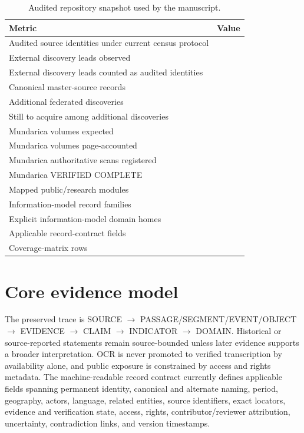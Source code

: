 \documentclass[11pt]{article}
\begin{document}
\begin{table}[ht]
\caption{Audited repository snapshot used by the manuscript.}
\label{tab:release}
\centering
\begin{tabular}{lr}
\toprule
Metric & Value \\
\midrule
Audited source identities under current census protocol & \MLHKPSourcesDiscovered{} \\
External discovery leads observed & \MLHKPWebDiscoveryLeads{} \\
External discovery leads counted as audited identities & \MLHKPWebDiscoveryCounted{} \\
Canonical master-source records & \MLHKPCanonicalSources{} \\
Additional federated discoveries & \MLHKPAdditionalDiscoveries{} \\
Still to acquire among additional discoveries & \MLHKPStillToAcquire{} \\
Mundarica volumes expected & \MLHKPMundaricaExpected{} \\
Mundarica volumes page-accounted & \MLHKPMundaricaPageAccounted{} \\
Mundarica authoritative scans registered & \MLHKPMundaricaScans{} \\
Mundarica VERIFIED COMPLETE & \MLHKPMundaricaVerified{} \\
Mapped public/research modules & \MLHKPModules{} \\
Information-model record families & \MLHKPRecordFamilies{} \\
Explicit information-model domain homes & \MLHKPDomainHomes{} \\
Applicable record-contract fields & \MLHKPRecordFields{} \\
Coverage-matrix rows & \MLHKPCoverageRows{} \\
\bottomrule
\end{tabular}
\end{table}

\section{Core evidence model}
The preserved trace is SOURCE $\rightarrow$ PASSAGE/SEGMENT/EVENT/OBJECT $\rightarrow$ EVIDENCE $\rightarrow$ CLAIM $\rightarrow$ INDICATOR $\rightarrow$ DOMAIN. Historical or source-reported statements remain source-bounded unless later evidence supports a broader interpretation. OCR is never promoted to verified transcription by availability alone, and public exposure is constrained by access and rights metadata. The machine-readable record contract currently defines \MLHKPRecordFields{} applicable fields spanning permanent identity, canonical and alternate naming, period, geography, actors, language, related entities, source identifiers, exact locators, evidence and verification state, access, rights, contributor/reviewer attribution, uncertainty, contradiction links, and version timestamps.
\end{document}
